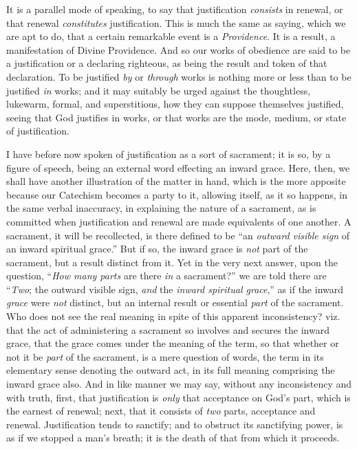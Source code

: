 It is a parallel mode of speaking, to say that justification \emph{consists}
in renewal, or that renewal \emph{constitutes} justification. This is
much the same as saying, which we are apt to do, that a certain
remarkable event is a \emph{Providence}. It is a result, a
manifestation of Divine Providence. And so our works of obedience are
said to be a justification or a declaring righteous, as being the
result and token of that declaration. To be justified \emph{by} or \emph{through}
works is nothing more or less than to be justified \emph{in} works;
and it may suitably be urged against the thoughtless, lukewarm,
formal, and superstitious, how they can suppose themselves justified,
seeing that God justifies in works, or that works are the mode,
medium, or state of justification.

I have before now spoken of justification as a sort of sacrament;
it is so, by a figure of speech, being an external word effecting an
inward grace. Here, then, we shall have another illustration of the
matter in hand, which is the more apposite because our Catechism
becomes a party to it, allowing itself, as it so happens, in the same
verbal inaccuracy, in explaining the nature of a sacrament, as is
committed when justification and renewal are made equivalents of one
another. A sacrament, it will be recollected, is there defined to be
``an \emph{outward visible sign} of an inward spiritual
grace.'' But if so, the inward grace is \emph{not} part of the
sacrament, but a result distinct from it. Yet in the very next answer,
upon the question, ``\emph{How many parts} are there \emph{in} a
sacrament?'' we are told there are ``\emph{Two}; the outward
visible sign, \emph{and} the \emph{inward spiritual grace},'' as
if the inward \emph{grace} were \emph{not} distinct, but an internal
result or essential \emph{part} of the sacrament. Who does not see the
real meaning in spite of this apparent inconsistency? viz. that
the act of administering a sacrament so involves and secures the
inward grace, that the grace comes under the meaning of the term, so
that whether or not it be \emph{part} of the sacrament, is a mere
question of words, the term in its elementary sense denoting the
outward act, in its full meaning comprising the inward grace also. And
in like manner we may say, without any inconsistency and with truth,
first, that justification is \emph{only} that acceptance on God's
part, which is the earnest of renewal; next, that it consists of \emph{two}
parts, acceptance and renewal. Justification tends to sanctify; and to
obstruct its sanctifying power, is as if we stopped a man's breath; it
is the death of that from which it proceeds.

